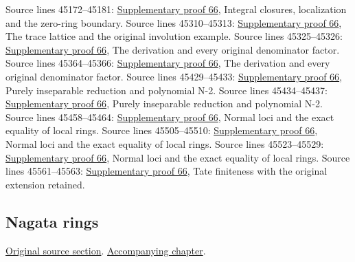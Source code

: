 \begin{AlgebraSourceRoutes}
 Source lines 45172--45181: \hyperlink{algebra_japanese_notes_20260929}{Supplementary proof 66}, Integral closures, localization and the zero-ring boundary.
 Source lines 45310--45313: \hyperlink{algebra_japanese_notes_20260929}{Supplementary proof 66}, The trace lattice and the original involution example.
 Source lines 45325--45326: \hyperlink{algebra_japanese_notes_20260929}{Supplementary proof 66}, The derivation and every original denominator factor.
 Source lines 45364--45366: \hyperlink{algebra_japanese_notes_20260929}{Supplementary proof 66}, The derivation and every original denominator factor.
 Source lines 45429--45433: \hyperlink{algebra_japanese_notes_20260929}{Supplementary proof 66}, Purely inseparable reduction and polynomial N-2.
 Source lines 45434--45437: \hyperlink{algebra_japanese_notes_20260929}{Supplementary proof 66}, Purely inseparable reduction and polynomial N-2.
 Source lines 45458--45464: \hyperlink{algebra_japanese_notes_20260929}{Supplementary proof 66}, Normal loci and the exact equality of local rings.
 Source lines 45505--45510: \hyperlink{algebra_japanese_notes_20260929}{Supplementary proof 66}, Normal loci and the exact equality of local rings.
 Source lines 45523--45529: \hyperlink{algebra_japanese_notes_20260929}{Supplementary proof 66}, Normal loci and the exact equality of local rings.
 Source lines 45561--45563: \hyperlink{algebra_japanese_notes_20260929}{Supplementary proof 66}, Tate finiteness with the original extension retained.
\end{AlgebraSourceRoutes}

\subsection{Nagata rings}
\hypertarget{algebra-source-section-nagata}{}
\noindent\href{https://github.com/stacks/stacks-project/blob/a04446e57ec1fbc252a871afcec7752fb2807b14/algebra.tex\#L45615}{Original source section}. \href{algebra.pdf\#nameddest=section-nagata}{Accompanying chapter}.

